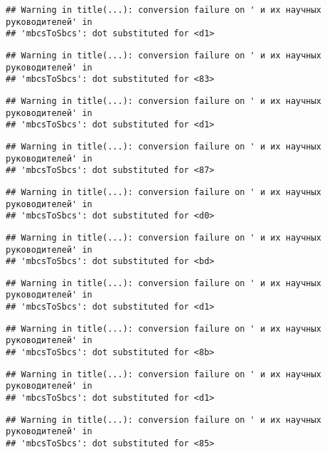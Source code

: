 \documentclass[
]{article}
\begin{document}
\begin{verbatim}
## Warning in title(...): conversion failure on ' и их научных руководителей' in
## 'mbcsToSbcs': dot substituted for <d1>
\end{verbatim}

\begin{verbatim}
## Warning in title(...): conversion failure on ' и их научных руководителей' in
## 'mbcsToSbcs': dot substituted for <83>
\end{verbatim}

\begin{verbatim}
## Warning in title(...): conversion failure on ' и их научных руководителей' in
## 'mbcsToSbcs': dot substituted for <d1>
\end{verbatim}

\begin{verbatim}
## Warning in title(...): conversion failure on ' и их научных руководителей' in
## 'mbcsToSbcs': dot substituted for <87>
\end{verbatim}

\begin{verbatim}
## Warning in title(...): conversion failure on ' и их научных руководителей' in
## 'mbcsToSbcs': dot substituted for <d0>
\end{verbatim}

\begin{verbatim}
## Warning in title(...): conversion failure on ' и их научных руководителей' in
## 'mbcsToSbcs': dot substituted for <bd>
\end{verbatim}

\begin{verbatim}
## Warning in title(...): conversion failure on ' и их научных руководителей' in
## 'mbcsToSbcs': dot substituted for <d1>
\end{verbatim}

\begin{verbatim}
## Warning in title(...): conversion failure on ' и их научных руководителей' in
## 'mbcsToSbcs': dot substituted for <8b>
\end{verbatim}

\begin{verbatim}
## Warning in title(...): conversion failure on ' и их научных руководителей' in
## 'mbcsToSbcs': dot substituted for <d1>
\end{verbatim}

\begin{verbatim}
## Warning in title(...): conversion failure on ' и их научных руководителей' in
## 'mbcsToSbcs': dot substituted for <85>
\end{verbatim}
\end{document}
